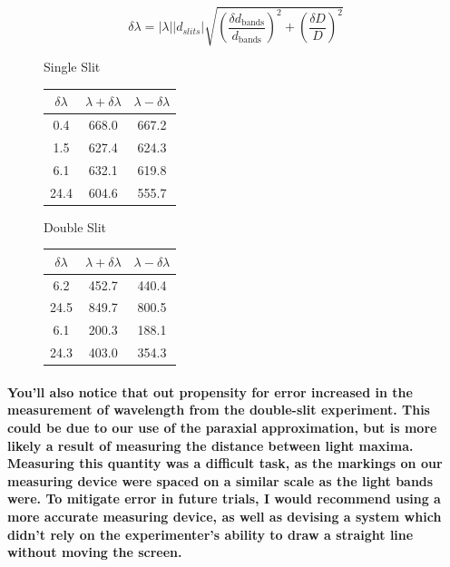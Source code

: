 \documentclass[double]{amsart}
\begin{document}
{\paragraph{}
\begin{figure}[H]
\begin{minipage}{.43\textwidth}
\begin{equation}
\delta\lambda = |\lambda||d_{slits}|\sqrt{\left( \dfrac{\delta d_\text{bands}}{d_\text{bands}} \right)^2+ \left(\dfrac{\delta D}{D}\right)^2}
\end{equation}
\end{minipage}
%
\begin{minipage}{.27\textwidth}
\begin{table}[H]
\centering
Single Slit
\begin{tabular}{c|c|c}
$\delta\lambda$ & $\lambda + \delta\lambda$ & $\lambda - \delta\lambda$ \\ \hline
0.4  & 668.0                     & 667.2                     \\
1.5  & 627.4                     & 624.3                     \\
6.1  & 632.1                     & 619.8                     \\
24.4 & 604.6                     & 555.7                    
\end{tabular}
\end{table}
\end{minipage}
%
\begin{minipage}{.27\textwidth}
\begin{table}[H]
\centering
Double Slit
\begin{tabular}{c|c|c}
$\delta\lambda$ & $\lambda + \delta\lambda$ & $\lambda - \delta\lambda$ \\ \hline
6.2             & 452.7                     & 440.4                     \\
24.5            & 849.7                     & 800.5                     \\
6.1             & 200.3                     & 188.1                     \\
24.3            & 403.0                     & 354.3                    
\end{tabular}
\end{table}
\end{minipage}
\end{figure}
\paragraph{You'll also notice that out propensity for error increased in the measurement of wavelength from the double-slit experiment. This could be due to our use of the paraxial approximation, but is more likely a result of measuring the distance between light maxima. Measuring this quantity was a difficult task, as the markings on our measuring device were spaced on a similar scale as the light bands were. To mitigate error in future trials, I would recommend using a more accurate measuring device, as well as devising a system which didn't rely on the experimenter's ability to draw a straight line without moving the screen.}
}
\end{document}
